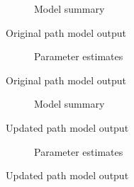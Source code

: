 \documentclass[11pt,a4paper]{article}
\begin{document}
\begin{figure}[htbp]
\begin{subfigure}{\textwidth}
\small{}
\caption{Model summary}
\end{subfigure}
\caption{Original path model output}
\label{fig:orig_model_output}
\end{figure}

\begin{figure}[htbp]\ContinuedFloat
\begin{subfigure}{\textwidth}

\caption{Parameter estimates}
\end{subfigure}
\caption{Original path model output}
\end{figure}

\begin{figure}[htbp]
\begin{subfigure}{\textwidth}
\small{}
\caption{Model summary}
\end{subfigure}
\caption{Updated path model output}
\label{fig:updated_model_output}
\end{figure}

\begin{figure}[htbp]\ContinuedFloat
\begin{subfigure}{\textwidth}

\caption{Parameter estimates}
\end{subfigure}
\caption{Updated path model output}
\end{figure}


\restoregeometry{}
\end{document}
